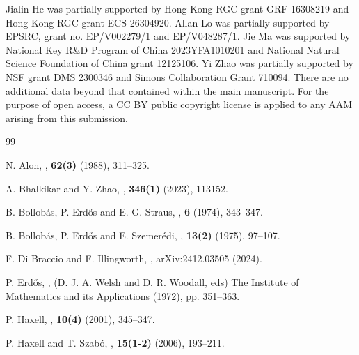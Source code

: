 \documentclass[11pt]{article}
\numberwithin{equation}{section}
\begin{document}
	Jialin He was partially supported by Hong Kong RGC grant GRF 16308219 and Hong Kong RGC grant ECS 26304920. Allan Lo was partially supported by EPSRC, grant no. EP/V002279/1 and EP/V048287/1. Jie Ma was supported by National Key R\&D Program of China 2023YFA1010201 and National Natural Science Foundation of China grant 12125106. Yi Zhao was partially supported by NSF grant DMS 2300346 and Simons Collaboration Grant 710094.
	There are no additional data beyond that contained within the main manuscript.
	For the purpose of open access, a CC BY public copyright license is applied to any AAM arising from this submission.
	
	
	\begin{thebibliography}{99}
		
		N. Alon,
		,
		 \textbf{62(3)} (1988), 311--325.

		A. Bhalkikar and Y. Zhao,
		,
		\textbf{346(1)} (2023), 113152.
		
		
		
		B. Bollob{\'a}s, P. Erd\H{o}s and E. G. Straus, 
		,
		 \textbf{6} (1974), 343--347.
		
		B. Bollob{\'a}s, P. Erd\H{o}s and E. Szemer{\'e}di,
		,
		\textbf{13(2)} (1975), 97--107.

		F. Di Braccio and F. Illingworth,
		, 
		arXiv:2412.03505 (2024).
		

		P. Erd\H{o}s,
		,
		(D. J. A. Welsh and D. R. Woodall, eds)
		The Institute of Mathematics and its Applications (1972), pp. 351--363.
		
		P. Haxell,
		,
		 \textbf{10(4)} (2001), 345--347.
		
		P. Haxell and T. Szab{\'o}, 
		,
		 \textbf{15(1-2)} (2006), 193--211.
		

\end{thebibliography}
\end{document}

